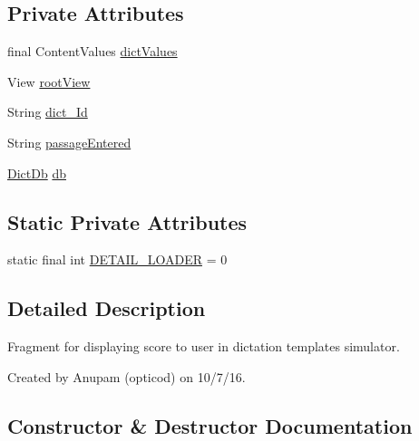 \subsection*{Private Attributes}
\begin{DoxyCompactItemize}
\item 
final Content\+Values \hyperlink{classorg_1_1buildmlearn_1_1toolkit_1_1dictationtemplate_1_1fragment_1_1ResultActivityFragment_a153233e750780e2456f543ba96028f45}{dict\+Values}
\item 
View \hyperlink{classorg_1_1buildmlearn_1_1toolkit_1_1dictationtemplate_1_1fragment_1_1ResultActivityFragment_ae67ea10f7f911465063442c443424083}{root\+View}
\item 
String \hyperlink{classorg_1_1buildmlearn_1_1toolkit_1_1dictationtemplate_1_1fragment_1_1ResultActivityFragment_acb55b4912fc2993618db00ca6e33ab23}{dict\+\_\+\+Id}
\item 
String \hyperlink{classorg_1_1buildmlearn_1_1toolkit_1_1dictationtemplate_1_1fragment_1_1ResultActivityFragment_afded822db2f8ac97a394751f6940ec97}{passage\+Entered}
\item 
\hyperlink{classorg_1_1buildmlearn_1_1toolkit_1_1dictationtemplate_1_1data_1_1DictDb}{Dict\+Db} \hyperlink{classorg_1_1buildmlearn_1_1toolkit_1_1dictationtemplate_1_1fragment_1_1ResultActivityFragment_a256692a07fa113a6687354cb998effbf}{db}
\end{DoxyCompactItemize}
\subsection*{Static Private Attributes}
\begin{DoxyCompactItemize}
\item 
static final int \hyperlink{classorg_1_1buildmlearn_1_1toolkit_1_1dictationtemplate_1_1fragment_1_1ResultActivityFragment_a751fac43cbc09463948fa39da5f28c06}{D\+E\+T\+A\+I\+L\+\_\+\+L\+O\+A\+D\+ER} = 0
\end{DoxyCompactItemize}


\subsection{Detailed Description}
Fragment for displaying score to user in dictation template\textquotesingle{}s simulator. 

Created by Anupam (opticod) on 10/7/16. 

\subsection{Constructor \& Destructor Documentation}

